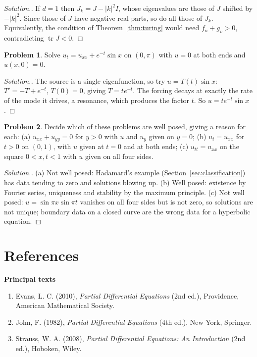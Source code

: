 \documentclass[11pt,a4paper]{article}
\numberwithin{equation}{section}
\theoremstyle{definition}
\newtheorem{problemx}{Problem}[subsection]
\newenvironment{problem}{\begin{problemx}}{\end{problemx}}
\newenvironment{solution}
  {\renewcommand{\qedsymbol}{}\begin{proof}[\textit{Solution}.]}
  {\end{proof}}
\newcommand{\subhead}[1]{%
  \par\medskip\noindent\textbf{#1}\par\nobreak\smallskip}
\begin{document}
\begin{solution}
If $d = 1$ then $J_k = J - |k|^2I$, whose eigenvalues are those of $J$ shifted by $-|k|^2$. Since those of $J$ have negative real parts, so do all those of $J_k$. Equivalently, the condition of Theorem~\ref{thm:turing} would need $f_u + g_v > 0$, contradicting $\operatorname{tr}J < 0$.
\end{solution}

\begin{problem}
Solve $u_t = u_{xx} + e^{-t}\sin x$ on $(0, \pi)$ with $u = 0$ at both ends and $u(x, 0) = 0$.
\end{problem}

\begin{solution}
The source is a single eigenfunction, so try $u = T(t)\sin x$: $T' = -T + e^{-t}$, $T(0) = 0$, giving $T = te^{-t}$. The forcing decays at exactly the rate of the mode it drives, a resonance, which produces the factor $t$. So $u = te^{-t}\sin x$.
\end{solution}

\begin{problem}
Decide which of these problems are well posed, giving a reason for each: (a) $u_{xx} + u_{yy} = 0$ for $y > 0$ with $u$ and $u_y$ given on $y = 0$; (b) $u_t = u_{xx}$ for $t > 0$ on $(0, 1)$, with $u$ given at $t = 0$ and at both ends; (c) $u_{tt} = u_{xx}$ on the square $0 < x, t < 1$ with $u$ given on all four
sides.
\end{problem}

\begin{solution}
(a) Not well posed: Hadamard's example (Section~\ref{sec:classification}) has data tending to zero and solutions blowing up. (b) Well posed: existence by Fourier series, uniqueness and stability by the maximum principle. (c) Not well posed: $u = \sin\pi x\sin\pi t$ vanishes on all four sides but is not zero, so solutions are not unique;
boundary data on a closed curve are the wrong data for a hyperbolic equation.
\end{solution}

\section*{References}
\sloppy

\subhead{Principal texts}
\begin{enumerate}
\item Evans, L. C. (2010), \emph{Partial Differential Equations} (2nd ed.), Providence, American Mathematical Society.
\item John, F. (1982), \emph{Partial Differential Equations} (4th ed.), New York, Springer.
\item Strauss, W. A. (2008), \emph{Partial Differential Equations: An Introduction} (2nd ed.), Hoboken, Wiley.
\end{enumerate}
\end{document}
